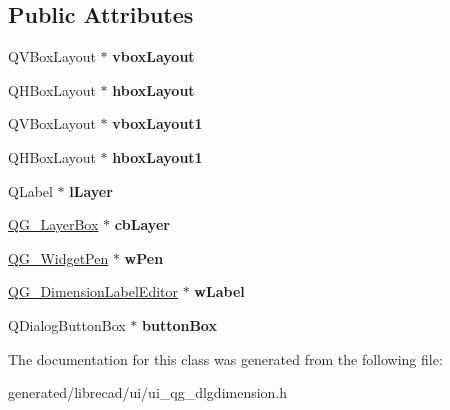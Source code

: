 \subsection*{Public Attributes}
\begin{DoxyCompactItemize}
\item 
\hypertarget{classUi__QG__DlgDimension_a71099fa142dcac15cc0425488d703492}{Q\-V\-Box\-Layout $\ast$ {\bfseries vbox\-Layout}}\label{classUi__QG__DlgDimension_a71099fa142dcac15cc0425488d703492}

\item 
\hypertarget{classUi__QG__DlgDimension_a50c6b9c3b1d342acfe0a8cb0ca244833}{Q\-H\-Box\-Layout $\ast$ {\bfseries hbox\-Layout}}\label{classUi__QG__DlgDimension_a50c6b9c3b1d342acfe0a8cb0ca244833}

\item 
\hypertarget{classUi__QG__DlgDimension_a4163a0e34b7e9d6cf175f87d6a8c3b55}{Q\-V\-Box\-Layout $\ast$ {\bfseries vbox\-Layout1}}\label{classUi__QG__DlgDimension_a4163a0e34b7e9d6cf175f87d6a8c3b55}

\item 
\hypertarget{classUi__QG__DlgDimension_abb4164955d980d01ed0eec3b6fc5e17c}{Q\-H\-Box\-Layout $\ast$ {\bfseries hbox\-Layout1}}\label{classUi__QG__DlgDimension_abb4164955d980d01ed0eec3b6fc5e17c}

\item 
\hypertarget{classUi__QG__DlgDimension_a4a4214f200b1a4b56da4b9f3e735620d}{Q\-Label $\ast$ {\bfseries l\-Layer}}\label{classUi__QG__DlgDimension_a4a4214f200b1a4b56da4b9f3e735620d}

\item 
\hypertarget{classUi__QG__DlgDimension_a8e75ea3755efc554ddf7abba1c9d997c}{\hyperlink{classQG__LayerBox}{Q\-G\-\_\-\-Layer\-Box} $\ast$ {\bfseries cb\-Layer}}\label{classUi__QG__DlgDimension_a8e75ea3755efc554ddf7abba1c9d997c}

\item 
\hypertarget{classUi__QG__DlgDimension_a5ae9530e1b68ded461c95494099e66d4}{\hyperlink{classQG__WidgetPen}{Q\-G\-\_\-\-Widget\-Pen} $\ast$ {\bfseries w\-Pen}}\label{classUi__QG__DlgDimension_a5ae9530e1b68ded461c95494099e66d4}

\item 
\hypertarget{classUi__QG__DlgDimension_a038238c923078aff4a2818f4ce298423}{\hyperlink{classQG__DimensionLabelEditor}{Q\-G\-\_\-\-Dimension\-Label\-Editor} $\ast$ {\bfseries w\-Label}}\label{classUi__QG__DlgDimension_a038238c923078aff4a2818f4ce298423}

\item 
\hypertarget{classUi__QG__DlgDimension_a51f0ef6c688e24a1f918e7a356feaf3b}{Q\-Dialog\-Button\-Box $\ast$ {\bfseries button\-Box}}\label{classUi__QG__DlgDimension_a51f0ef6c688e24a1f918e7a356feaf3b}

\end{DoxyCompactItemize}


The documentation for this class was generated from the following file\-:\begin{DoxyCompactItemize}
\item 
generated/librecad/ui/ui\-\_\-qg\-\_\-dlgdimension.\-h\end{DoxyCompactItemize}
